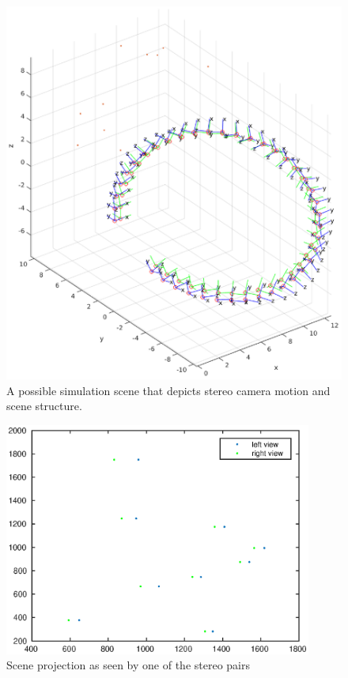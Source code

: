 \documentclass[10pt]{article}         %
\begin{document}
\begin{figure}
  \centering
  \includegraphics[width=1.5\textwidth]{camera_poses}
  \caption{A possible simulation scene that depicts stereo camera
    motion and scene structure.}
  \label{fig:poses}
\end{figure}%
\begin{figure}
  \centering
  \includegraphics[width=0.9\textwidth]{camera_proj}
  \caption{Scene projection as seen by one of the stereo pairs}
  \label{fig:proj}
\end{figure}
\end{document}
